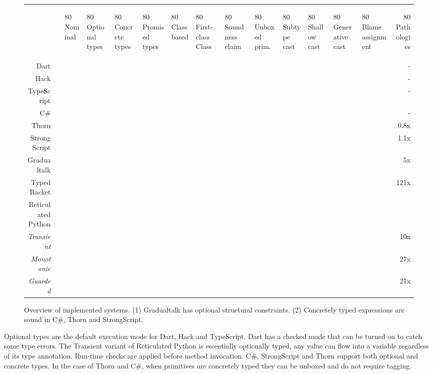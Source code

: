 \documentclass[a4paper,USenglish]{tex/lipics-v2016}
\begin{document}
\newcommand{\rot}[1]{\begin{rotate}{80} #1 \end{rotate}}
\newcommand{\X}{\EM{\bullet}}
\newcommand{\XX}{\EM{\bullet^2}}
\newcommand{\XY}{\EM{\bullet^1}}

\begin{figure}[!ht]
  \center
~ \\[2cm]
  {\small
\begin{tabular}{r|lllllllllllllr}
& & \rot{Nominal}
  & \rot{Optional types}
  & \rot{Concrete types}
  & \rot{Promised types}
  & \rot{Class based}
  & \rot{First-class Class}
  & \rot{Soundness claim}
  & \rot{Unboxed prim.}
  & \rot{Subtype cast}
  & \rot{Shallow cast}
  & \rot{Generative cast}
  & \rot{Blame assignment}
  & \rot{Pathologies}
  \\
Dart         &&\X &\X &   &   &\X &   &    &    &\X &   &   &   &  - 
\\\hline
Hack         &&\X &\X &   &   &\X &   &    &    &\X &   &   &   &  -  
\\\hline
TypeScript   &&   &\X &   &   &\X &   &    &    &   &   &   &   &  -  
\\\hline
C\#          &&\X &\X &\X &   &\X &   &\XX & \X &\X &   &   &   &  -  
\\\hline
Thorn        &&\X &\X &\X &   &\X &   &\XX & \X &\X &   &   &   & 0.8x
\\\hline
StrongScript &&\X &\X &\X &\X &\X &   &\XX &    &\X &   &\X &   & 1.1x   
\\\hline
Gradualtalk  &&\XY&   &   &\X &\X &   & \X &    &   &   &\X &\X &  5x
\\\hline
Typed Racket &&   &   &   &\X &\X &\X &\X  &    &   &\X &\X &\X & 121x 
\\\hline
Reticulated Python    \\
\it Transient&&   &\X &   &   & \X &  & \X &    &   &\X &   &\X & 10x \\
\it Monotonic&&   &   &   &\X & \X &  & \X &    &   &   &\X &\X &  27x\\
\it Guarded  &&   &   &   &\X & \X &  & \X &    &   &   &\X &\X &  21x\\
\end{tabular}}
  \caption{Overview of implemented systems. (1) Gradualtalk has optional
    structural constraints. (2) Concretely typed expressions are sound in
    C\#, Thorn and StrongScript.}\label{over}
\end{figure}

Optional types are the default execution mode for Dart, Hack and TypeScript.
Dart has a checked mode that can be turned on to catch some type errors.
The Transient variant of Reticulated Python is essentially optionally typed,
any value can flow into a variable regardless of its type
annotation. Run-time checks are applied before method invocation.  C\#,
StrongScript and Thorn support both optional and concrete types.  In the
case of Thorn and C\#, when primitives are concretely typed they can be
unboxed and do not require tagging.
\end{document}

